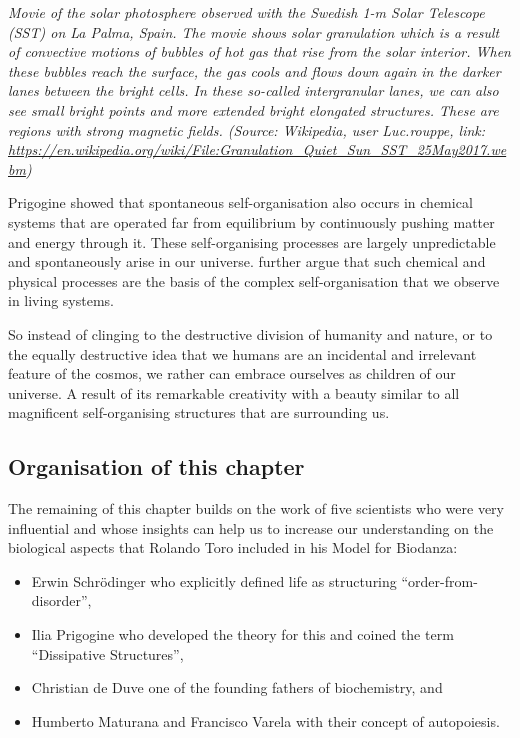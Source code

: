 \documentclass[
  11pt,
]{book}
\providecommand{\tightlist}{%
  \setlength{\itemsep}{0pt}\setlength{\parskip}{0pt}}
\begin{document}
\emph{Movie of the solar photosphere observed with the Swedish 1-m Solar Telescope (SST) on La Palma, Spain. The movie shows solar granulation which is a result of convective motions of bubbles of hot gas that rise from the solar interior. When these bubbles reach the surface, the gas cools and flows down again in the darker lanes between the bright cells. In these so-called intergranular lanes, we can also see small bright points and more extended bright elongated structures. These are regions with strong magnetic fields. (Source: Wikipedia, user Luc.rouppe, link: \url{https://en.wikipedia.org/wiki/File:Granulation_Quiet_Sun_SST_25May2017.webm})}

Prigogine showed that spontaneous self-organisation also occurs in chemical systems that are operated far from equilibrium by continuously pushing matter and energy through it. These self-organising processes are largely unpredictable and spontaneously arise in our universe.
\citet{prigogineStengers1984} further argue that such chemical and physical processes are the basis of the complex self-organisation that we observe in living systems.

So instead of clinging to the destructive division of humanity and nature, or to the equally destructive idea that we humans are an incidental and irrelevant feature of the cosmos, we rather can embrace ourselves as children of our universe. A result of its remarkable creativity with a beauty similar to all magnificent self-organising structures that are surrounding us.

\hypertarget{organisation-of-this-chapter}{%
\subsection{Organisation of this chapter}\label{organisation-of-this-chapter}}

The remaining of this chapter builds on the work of five scientists who were very influential and whose insights can help us to increase our understanding on the biological aspects that Rolando Toro included in his Model for Biodanza:

\begin{itemize}
\tightlist
\item
  Erwin Schrödinger who explicitly defined life as structuring ``order-from-disorder'',
\item
  Ilia Prigogine who developed the theory for this and coined the term ``Dissipative Structures'',
\item
  Christian de Duve one of the founding fathers of biochemistry, and
\item
  Humberto Maturana and Francisco Varela with their concept of autopoiesis.
\end{itemize}
\end{document}
